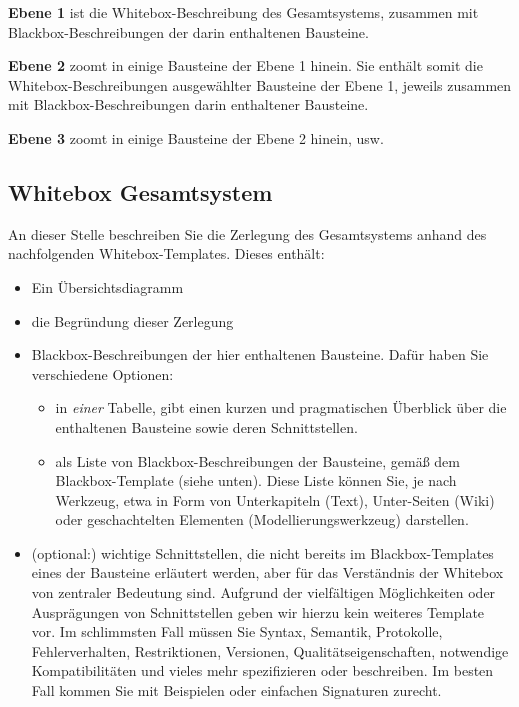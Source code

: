 \documentclass[]{article}
\begin{document}
\textbf{Ebene 1} ist die Whitebox-Beschreibung des Gesamtsystems,
zusammen mit Blackbox-Beschreibungen der darin enthaltenen Bausteine.

\textbf{Ebene 2} zoomt in einige Bausteine der Ebene 1 hinein. Sie
enthält somit die Whitebox-Beschreibungen ausgewählter Bausteine der
Ebene 1, jeweils zusammen mit Blackbox-Beschreibungen darin enthaltener
Bausteine.

\textbf{Ebene 3} zoomt in einige Bausteine der Ebene 2 hinein, usw.

\subsection{Whitebox Gesamtsystem}\label{_whitebox_gesamtsystem}

An dieser Stelle beschreiben Sie die Zerlegung des Gesamtsystems anhand
des nachfolgenden Whitebox-Templates. Dieses enthält:

\begin{itemize}
\item
  Ein Übersichtsdiagramm
\item
  die Begründung dieser Zerlegung
\item
  Blackbox-Beschreibungen der hier enthaltenen Bausteine. Dafür haben
  Sie verschiedene Optionen:

  \begin{itemize}
  \item
    in \emph{einer} Tabelle, gibt einen kurzen und pragmatischen
    Überblick über die enthaltenen Bausteine sowie deren Schnittstellen.
  \item
    als Liste von Blackbox-Beschreibungen der Bausteine, gemäß dem
    Blackbox-Template (siehe unten). Diese Liste können Sie, je nach
    Werkzeug, etwa in Form von Unterkapiteln (Text), Unter-Seiten (Wiki)
    oder geschachtelten Elementen (Modellierungswerkzeug) darstellen.
  \end{itemize}
\item
  (optional:) wichtige Schnittstellen, die nicht bereits im
  Blackbox-Templates eines der Bausteine erläutert werden, aber für das
  Verständnis der Whitebox von zentraler Bedeutung sind. Aufgrund der
  vielfältigen Möglichkeiten oder Ausprägungen von Schnittstellen geben
  wir hierzu kein weiteres Template vor. Im schlimmsten Fall müssen Sie
  Syntax, Semantik, Protokolle, Fehlerverhalten, Restriktionen,
  Versionen, Qualitätseigenschaften, notwendige Kompatibilitäten und
  vieles mehr spezifizieren oder beschreiben. Im besten Fall kommen Sie
  mit Beispielen oder einfachen Signaturen zurecht.
\end{itemize}
\end{document}
